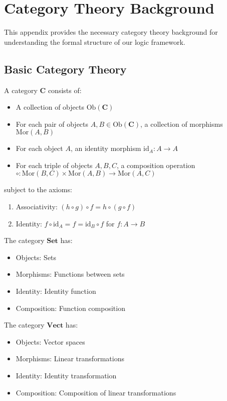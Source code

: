 \section{Category Theory Background}
\label{app:category-theory}

This appendix provides the necessary category theory background for understanding the formal structure of our logic framework.

\subsection{Basic Category Theory}

\begin{definition}[Category]
A category $\mathbf{C}$ consists of:
\begin{itemize}
\item A collection of objects $\text{Ob}(\mathbf{C})$
\item For each pair of objects $A, B \in \text{Ob}(\mathbf{C})$, a collection of morphisms $\text{Mor}(A, B)$
\item For each object $A$, an identity morphism $\text{id}_A: A \to A$
\item For each triple of objects $A, B, C$, a composition operation $\circ: \text{Mor}(B, C) \times \text{Mor}(A, B) \to \text{Mor}(A, C)$
\end{itemize}
subject to the axioms:
\begin{enumerate}
\item Associativity: $(h \circ g) \circ f = h \circ (g \circ f)$
\item Identity: $f \circ \text{id}_A = f = \text{id}_B \circ f$ for $f: A \to B$
\end{enumerate}
\end{definition}

\begin{example}
The category $\mathbf{Set}$ has:
\begin{itemize}
\item Objects: Sets
\item Morphisms: Functions between sets
\item Identity: Identity function
\item Composition: Function composition
\end{itemize}
\end{example}

\begin{example}
The category $\mathbf{Vect}$ has:
\begin{itemize}
\item Objects: Vector spaces
\item Morphisms: Linear transformations
\item Identity: Identity transformation
\item Composition: Composition of linear transformations
\end{itemize}
\end{example}

